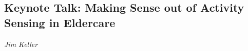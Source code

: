\documentclass[../booklet.tex]{subfiles}
\begin{document}
\subsection[Keynote Talk: Making Sense out of Activity Sensing in Eldercare. {\it Jim Keller}]{Keynote Talk: Making Sense out of Activity Sensing in Eldercare}

\begin{center}
  {\it Jim Keller}
\end{center}



 
% 
\end{document}
